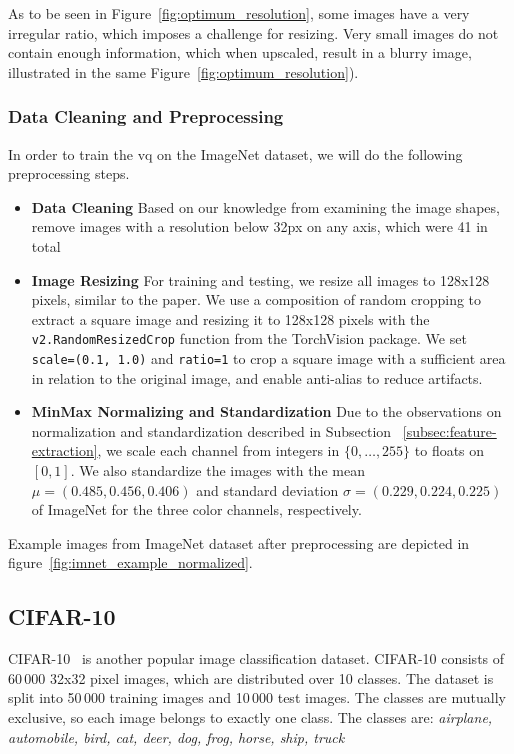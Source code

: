 As to be seen in Figure~\ref{fig:optimum_resolution}, some images have a very irregular ratio, which imposes a challenge
for resizing.
Very small images do not contain enough information, which when upscaled, result in a blurry image, illustrated in
the same Figure~\ref{fig:optimum_resolution}).

\subsubsection{Data Cleaning and Preprocessing}
In order to train the \ac{vq} on the ImageNet dataset, we will do the following preprocessing steps.

\begin{itemize}
    \item \textbf{Data Cleaning}
    Based on our knowledge from examining the image shapes, remove images with a resolution below 32px on any axis,
    which were 41 in total
    \item \textbf{Image Resizing}
    For training and testing, we resize all images to 128x128 pixels, similar to the paper.
    We use a composition of random cropping to extract a square image and resizing it to 128x128 pixels with
    the \texttt{v2.RandomResizedCrop} function from the TorchVision package.
    We set \texttt{scale=(0.1, 1.0)} and \texttt{ratio=1} to crop a square image with a sufficient area in
    relation to the original image, and enable anti-alias to reduce artifacts.
    \item \textbf{MinMax Normalizing and Standardization}
    Due to the observations on normalization and standardization described in Subsection
    ~\ref{subsec:feature-extraction}, we scale each channel from integers in $\{0,\dots,255\}$ to floats on
    $[0,1]$.
    We also standardize the images with the mean $\mu = (0.485, 0.456, 0.406)$ and standard deviation
    $\sigma = (0.229, 0.224, 0.225)$ of ImageNet for the three color channels, respectively.
\end{itemize}

Example images from ImageNet dataset after preprocessing are depicted in figure~\ref{fig:imnet_example_normalized}.

\subsection{CIFAR-10}\label{subsec:cifar-10}
CIFAR-10~\cite{cifar10} is another popular image classification dataset.
CIFAR-10 consists of 60\,000 32x32 pixel images, which are distributed over 10 classes.
The dataset is split into 50\,000 training images and 10\,000 test images.
The classes are mutually exclusive, so each image belongs to exactly one class.
The classes are: \textit{airplane, automobile, bird, cat, deer, dog, frog, horse, ship, truck}

